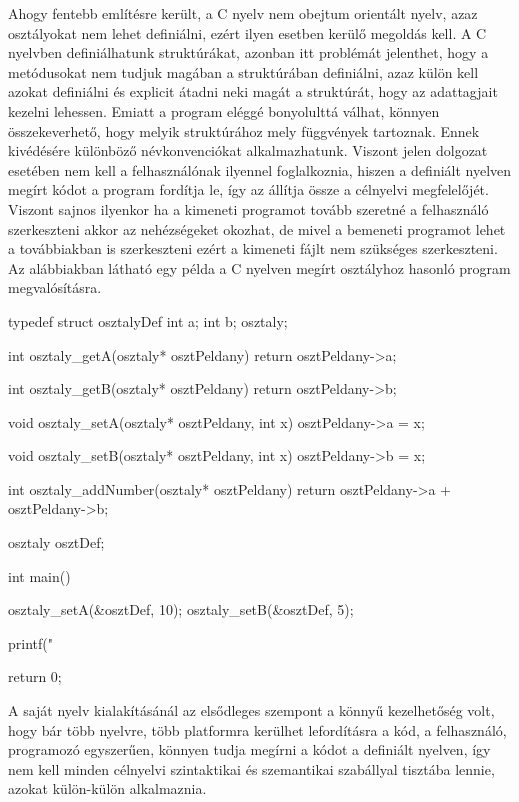 Ahogy fentebb említésre került, a C nyelv nem obejtum orientált nyelv, azaz osztályokat nem lehet definiálni, ezért ilyen esetben kerülő megoldás kell. A C nyelvben definiálhatunk struktúrákat, azonban itt problémát jelenthet, hogy a metódusokat nem tudjuk magában a struktúrában definiálni, azaz külön kell azokat definiálni és explicit átadni neki magát a struktúrát, hogy az adattagjait kezelni lehessen. Emiatt a program eléggé bonyolulttá válhat, könnyen összekeverhető, hogy melyik struktúrához mely függvények tartoznak. Ennek kivédésére különböző névkonvenciókat alkalmazhatunk. Viszont jelen dolgozat esetében nem kell a felhasználónak ilyennel foglalkoznia, hiszen a definiált nyelven megírt kódot a program fordítja le, így az állítja össze a célnyelvi megfelelőjét. Viszont sajnos ilyenkor ha a kimeneti programot tovább szeretné a felhasználó szerkeszteni akkor az nehézségeket okozhat, de mivel a bemeneti programot lehet a továbbiakban is szerkeszteni ezért a kimeneti fájlt nem szükséges szerkeszteni.
Az alábbiakban látható egy példa a C nyelven megírt osztályhoz hasonló program megvalósításra.
\begin{cpp}
	typedef struct osztalyDef {
		int a;
		int b;
	} osztaly;
	
	int osztaly_getA(osztaly* osztPeldany) {
		return osztPeldany->a;
	}
	
	int osztaly_getB(osztaly* osztPeldany) {
		return osztPeldany->b;
	}
	
	void osztaly_setA(osztaly* osztPeldany, int x) {
		osztPeldany->a = x;
	}
	
	void osztaly_setB(osztaly* osztPeldany, int x) {
		osztPeldany->b = x;
	}
	
	int osztaly_addNumber(osztaly* osztPeldany) {
		return osztPeldany->a + osztPeldany->b;
	}
	
	osztaly osztDef;
	
	int main()
	{
		osztaly_setA(&osztDef, 10);
		osztaly_setB(&osztDef, 5);
		
		printf("%
		
		return 0;
	}
\end{cpp}



A saját nyelv kialakításánál az elsődleges szempont a könnyű kezelhetőség volt, hogy bár több nyelvre, több platformra kerülhet lefordításra a kód, a felhasználó, programozó egyszerűen, könnyen tudja megírni a kódot a definiált nyelven, így nem kell minden célnyelvi szintaktikai és szemantikai szabállyal tisztába lennie, azokat külön-külön alkalmaznia.

